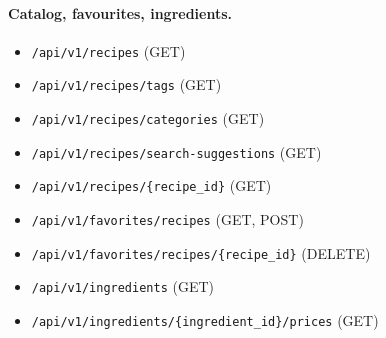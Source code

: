 \paragraph{Catalog, favourites, ingredients.}
\begin{itemize}
\item \texttt{/api/v1/recipes} (GET)
\item \texttt{/api/v1/recipes/tags} (GET)
\item \texttt{/api/v1/recipes/categories} (GET)
\item \texttt{/api/v1/recipes/search-suggestions} (GET)
\item \texttt{/api/v1/recipes/\{recipe\_id\}} (GET)
\item \texttt{/api/v1/favorites/recipes} (GET, POST)
\item \texttt{/api/v1/favorites/recipes/\{recipe\_id\}} (DELETE)
\item \texttt{/api/v1/ingredients} (GET)
\item \texttt{/api/v1/ingredients/\{ingredient\_id\}/prices} (GET)
\end{itemize}

